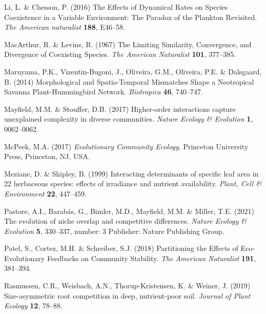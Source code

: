 \documentclass[11pt]{article}
\begin{document}
\begin{thebibliography}{51}
Li, L. \& Chesson, P. (2016) The {Effects} of {Dynamical} {Rates} on {Species}
  {Coexistence} in a {Variable} {Environment}: {The} {Paradox} of the
  {Plankton} {Revisited}. \emph{The American naturalist} \textbf{188}, E46--58.

MacArthur, R. \& Levins, R. (1967) The {Limiting} {Similarity}, {Convergence},
  and {Divergence} of {Coexisting} {Species}. \emph{The American Naturalist}
  \textbf{101}, 377--385.

Maruyama, P.K., Vizentin-Bugoni, J., Oliveira, G.M., Oliveira, P.E. \&
  Dalsgaard, B. (2014) Morphological and {Spatio}-{Temporal} {Mismatches}
  {Shape} a {Neotropical} {Savanna} {Plant}-{Hummingbird} {Network}.
  \emph{Biotropica} \textbf{46}, 740--747.

Mayfield, M.M. \& Stouffer, D.B. (2017) Higher-order interactions capture
  unexplained complexity in diverse communities. \emph{Nature Ecology \&
  Evolution} \textbf{1}, 0062--0062.

McPeek, M.A. (2017) \emph{{Evolutionary Community Ecology}}. Princeton
  University Press, Princeton, NJ, USA.

Meziane, D. \& Shipley, B. (1999) Interacting determinants of specific leaf
  area in 22 herbaceous species: effects of irradiance and nutrient
  availability. \emph{Plant, Cell \& Environment} \textbf{22}, 447--459.

Pastore, A.I., Barabás, G., Bimler, M.D., Mayfield, M.M. \& Miller, T.E.
  (2021) The evolution of niche overlap and competitive differences.
  \emph{Nature Ecology \& Evolution} \textbf{5}, 330--337, number: 3 Publisher:
  Nature Publishing Group.

Patel, S., Cortez, M.H. \& Schreiber, S.J. (2018) Partitioning the {Effects} of
  {Eco}-{Evolutionary} {Feedbacks} on {Community} {Stability}. \emph{The
  American Naturalist} \textbf{191}, 381--394.

Rasmussen, C.R., Weisbach, A.N., Thorup-Kristensen, K. \& Weiner, J. (2019)
  Size-asymmetric root competition in deep, nutrient-poor soil. \emph{Journal
  of Plant Ecology} \textbf{12}, 78--88.


\end{thebibliography}
\end{document}
